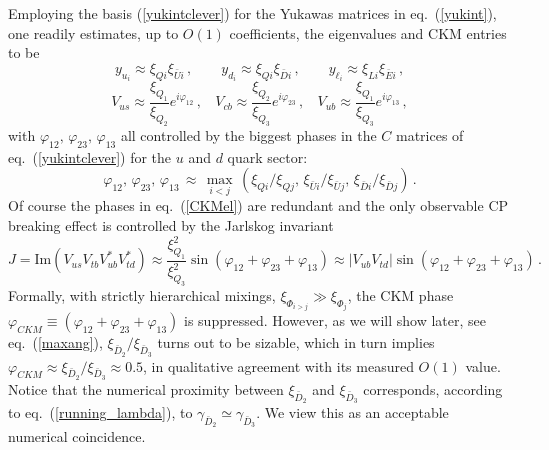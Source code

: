 \documentclass[a4paper,12pt]{article}
\newcommand{\beq}{\begin{equation}}
\newcommand{\eeq}{\end{equation}}
\def\eq#1{eq.~(\ref{#1})}
\def\eq#1{eq.~(\ref{#1})}
\DeclareMathOperator*{\Max}{max}
\begin{document}
Employing the basis (\ref{yukintclever}) for the Yukawas matrices in \eq{yukint},  one readily estimates, up to $O(1)$ coefficients,  the eigenvalues and  CKM entries to be
\beq
y_{u_i} \approx   \xi_{Qi}\xi_{\bar U i}\,,\qquad y_{d_i} \approx  \xi_{Qi}\xi_{\bar D i}\,,\qquad y_{\ell_i} \approx  \xi_{Li}\xi_{\bar E i}\,,
\label{eigenvaluesY}
\eeq
\beq
V_{us} \approx \frac{\xi_{Q_1}}{\xi_{Q_2}} e^{i\varphi_{12} } \,,~~~~
V_{cb} \approx \frac{\xi_{Q_2}}{\xi_{Q_3}} e^{i\varphi_{23} }\,,~~~~
V_{ub} \approx \frac{\xi_{Q_1}}{\xi_{Q_3}} e^{i\varphi_{13} } \, ,
\label{CKMel}
\eeq
with $\varphi_{12},\,\varphi_{23},\,\varphi_{13}$ all controlled by the biggest phases in the $C$ matrices of \eq{yukintclever} for the $u$ and $d$ quark sector:
\beq
\varphi_{12},\,\varphi_{23},\,\varphi_{13}\, \approx \,\Max\limits_{i<j}\,(\xi_{Qi}/ \xi_{Qj},\, \xi_{\bar U i}/ \xi_{\bar U j},\, \xi_{\bar D i}/ \xi_{\bar D j})\,.
\label{phi_ij}
\eeq
Of course the phases in \eq{CKMel} are redundant  and  the only observable CP breaking effect is controlled by the Jarlskog invariant
\beq
J= {\mathrm {Im}}(V_{us}V_{tb}V_{ub}^*V_{td}^*)\approx \frac{\xi_{Q_1}^2}{\xi_{Q_3}^2} \sin(\varphi_{12}+\varphi_{23}+\varphi_{13}) \approx |V_{ub}V_{td}| \sin(\varphi_{12}+\varphi_{23}+\varphi_{13})\, .
\eeq
Formally, with strictly hierarchical mixings, $\xi_{\Phi_{i>j}}\gg \xi_{\Phi_j}$, the CKM phase $\varphi_{CKM}\equiv (\varphi_{12}+\varphi_{23}+\varphi_{13})$ is suppressed. 
However, as we will show later, see \eq{maxang},  $\xi_{\bar D_2}/ \xi_{\bar D_3}$ turns out to be sizable,
which in turn implies $\varphi_{CKM}\approx {\xi_{\bar D_2}}/{ \xi_{\bar D_3}}\approx 0.5$, in qualitative agreement with its measured $O(1)$ value. Notice that the numerical proximity between $\xi_{\bar D_2}$ and $\xi_{\bar D_3}$ corresponds, according to \eq{running_lambda}, to $\gamma_{{\bar D}_2}\simeq \gamma_{{\bar D}_3}$. We view this as an acceptable numerical coincidence.
\end{document}
